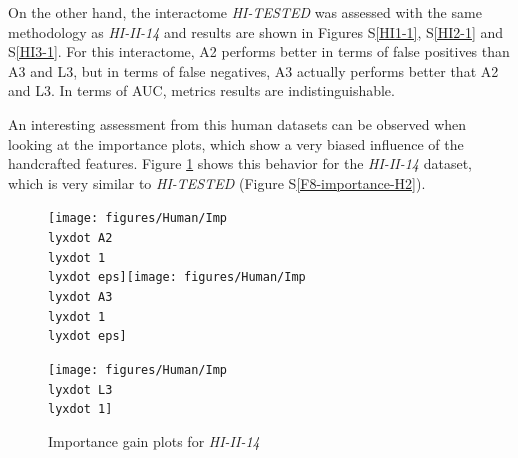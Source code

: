 On the other hand, the interactome \emph{HI-TESTED} was assessed with
the same methodology as \emph{HI-II-14} and results are shown in Figures
S\ref{HI1-1}, S\ref{HI2-1} and S\ref{HI3-1}. For this interactome,
A2 performs better in terms of false positives than A3 and L3, but
in terms of false negatives, A3 actually performs better that A2 and
L3. In terms of AUC, metrics results are indistinguishable. 

An interesting assessment from this human datasets can be observed
when looking at the importance plots, which show a very biased influence
of the handcrafted features. Figure \ref{F8-importance-H1} shows
this behavior for the \emph{HI-II-14} dataset, which is very similar
to \emph{HI-TESTED} (Figure S\ref{F8-importance-H2}).

\begin{figure}[h]
\noindent \begin{centering}
\caption{\label{F8-importance-H1}Importance gain plots for \emph{HI-II-14}}
\par\end{centering}
\begin{centering}
\texttt{[image: figures/Human/Imp\\lyxdot A2\\lyxdot 1\\lyxdot eps]}\texttt{[image: figures/Human/Imp\\lyxdot A3\\lyxdot 1\\lyxdot eps]}
\par\end{centering}
\centering{}\texttt{[image: figures/Human/Imp\\lyxdot L3\\lyxdot 1]}
\end{figure}